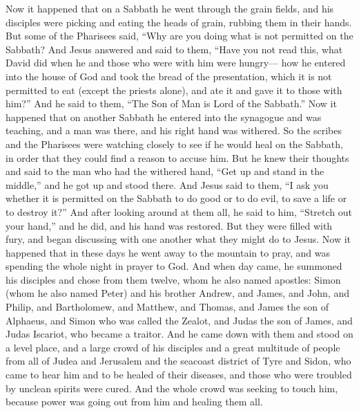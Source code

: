 \begin{biblechapter} %
 Now it happened that on a Sabbath he went through the grain fields, and his disciples were picking and eating the heads of grain, rubbing them in their hands.
\verse But some of the Pharisees said, “Why are you doing what is not permitted on the Sabbath?
\verse And Jesus answered and said to them, “Have you not read this, what David did when he and those who were with him were hungry—
\verse how he entered into the house of God and took the bread of the presentation, which it is not permitted to eat (except the priests alone), and ate it and gave it to those with him?”
\verse And he said to them, “The Son of Man is Lord of the Sabbath.”
 Now it happened that on another Sabbath he entered into the synagogue and was teaching, and a man was there, and his right hand was withered.
\verse So the scribes and the Pharisees were watching closely to see if he would heal on the Sabbath, in order that they could find a reason to accuse him.
\verse But he knew their thoughts and said to the man who had the withered hand, “Get up and stand in the middle,” and he got up and stood there.
\verse And Jesus said to them, “I ask you whether it is permitted on the Sabbath to do good or to do evil, to save a life or to destroy it?”
\verse And after looking around at them all, he said to him, “Stretch out your hand,” and he did, and his hand was restored.
\verse But they were filled with fury, and began discussing with one another what they might do to Jesus.
 Now it happened that in these days he went away to the mountain to pray, and was spending the whole night in prayer to God.
\verse And when day came, he summoned his disciples and chose from them twelve, whom he also named apostles:
\verse Simon (whom he also named Peter) and his brother Andrew, and James, and John, and Philip, and Bartholomew,
\verse and Matthew, and Thomas, and James the son of Alphaeus, and Simon who was called the Zealot,
\verse and Judas the son of James, and Judas Iscariot, who became a traitor.
 And he came down with them and stood on a level place, and a large crowd of his disciples and a great multitude of people from all of Judea and Jerusalem and the seacoast district of Tyre and Sidon,
\verse who came to hear him and to be healed of their diseases, and those who were troubled by unclean spirits were cured.
\verse And the whole crowd was seeking to touch him, because power was going out from him and healing them all.

\end{biblechapter}
